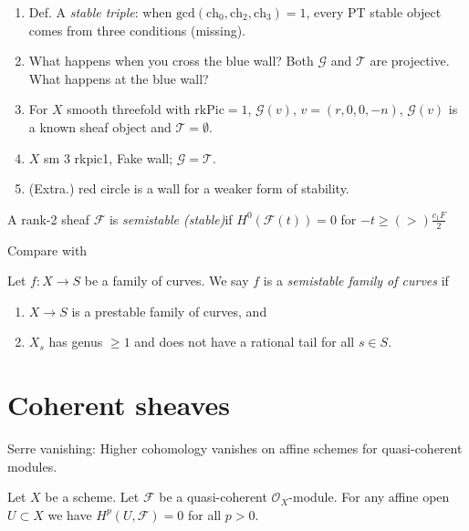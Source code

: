 \begin{enumerate}
\medskip
\item Def. A {\it stable triple}: when
$\text{gcd}(\text{ch}_0,\text{ch}_2,\text{ch}_3)=1$, every PT stable object
comes from three conditions (missing).
\item What happens when you cross the blue wall? 
Both $\mathcal{G}$ and $\mathcal{T}$ are projective. What happens at the blue
wall?
\medskip
\item For $X$ smooth threefold with $\text{rk}\text{Pic}=1$, $\mathcal{G}(v)$,
$v=(r,0,0,-n)$, $\mathcal{G}(v)$ is a known sheaf object and
$\mathcal{T}=\emptyset$.
\item $X$ sm 3 rkpic1, Fake wall; $\mathcal{G}=\mathcal{T}$.
\item (Extra.) red circle is a wall for a weaker form of stability.
\end{enumerate}
\begin{definition}
\label{definition-slope-stability}
A rank-2 sheaf $\mathcal{F}$ is {\it semistable (stable)}if
$H^{0}(\mathcal{F}(t))=0$ for $-t \geq(>) \frac{c_1F}{2}$
\end{definition}

Compare with

\begin{definition}
\label{definition-semistable}
Let $f : X \to S$ be a family of curves.
We say $f$ is a {\it semistable family of curves} if
\begin{enumerate}
\item $X \to S$ is a prestable family of curves, and
\item $X_s$ has genus $\geq 1$ and
does not have a rational tail for all $s \in S$.
\end{enumerate}
\end{definition}

\section{Coherent sheaves}
\label{section-coherent-sheaves}

\begin{lemma}
\label{lemma-quasi-coherent-affine-cohomology-zero}
\begin{slogan}
Serre vanishing: Higher cohomology vanishes on affine schemes
for quasi-coherent modules.
\end{slogan}
Let $X$ be a scheme.
Let $\mathcal{F}$ be a quasi-coherent $\mathcal{O}_X$-module.
For any affine open $U \subset X$ we have
$H^p(U, \mathcal{F}) = 0$ for all $p > 0$.
\end{lemma}

